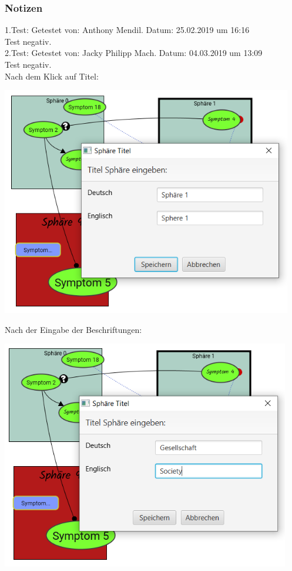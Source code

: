 \documentclass[enabledeprecatedfontcommands]{scrartcl}
\begin{document}
\subsubsection{Notizen}
1.Test: Getestet von: Anthony Mendil. Datum: 25.02.2019 um 16:16 \\
Test negativ. \\
2.Test: Getestet von: Jacky Philipp Mach. Datum: 04.03.2019 um 13:09 \\
Test negativ.\\
Nach dem Klick auf Titel: 
\begin{center}
\includegraphics[height=10cm]{3_49oeffnen.PNG}
\end{center}
Nach der Eingabe der Beschriftungen:
\begin{center}
\includegraphics[height=10cm]{3_49eingabe.PNG}
\end{center}
\end{document}

